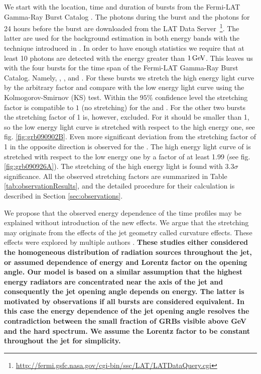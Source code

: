 \documentclass[manuscript]{aastex}
\begin{document}
We start with the location, time and duration of bursts from the
Fermi-LAT Gamma-Ray Burst Catalog \citep{Ackermann:2013zfa}. The
photons during the burst and the photons for 24 hours before the burst
are downloaded from the LAT Data
Server~\footnote{\url{http://fermi.gsfc.nasa.gov/cgi-bin/ssc/LAT/LATDataQuery.cgi}}.
The latter are used for the background estimation in both energy bands
with the technique introduced in \citet{Rubtsov:2011qq}. In order to
have enough statistics we require that at least 10 photons are
detected with the energy greater than $\unit[1]{GeV}$. This leaves us
with the four bursts for the time span of the Fermi-LAT Gamma-Ray
Burst Catalog. Namely,  \citep{Tajima:2009az}, 
\citep{Ackermann:2010us},  \citep{Abdo:2009pg} and
 \citep{Bregeon:2011bu}. For these bursts we stretch the
high energy light curve by the arbitrary factor and compare with the
low energy light curve using the Kolmogorov-Smirnov (KS) test. Within
the $95\%$ confidence level the stretching factor is compatible to $1$
(no stretching) for the  and . For the other two
bursts the stretching factor of 1 is, however, excluded.  For 
it should be smaller than 1, so the low energy light curve is
stretched with respect to the high energy one, see
fig. \ref{fig:grb090902B}.  Even more significant deviation from the
stretching factor of 1 in the opposite direction is observed for the
. The high energy light curve of  is stretched
with respect to the low energy one by a factor of at least 1.99 (see
fig. \ref{fig:grb090926A}).  The stretching of the  high
energy light is found with $3.3\sigma$ significance.  All the observed
stretching factors are summarized in Table
\ref{tab:observationResults}, and the detailed procedure for their
calculation is described in Section \ref{sec:observations}.

We propose that the observed energy dependence of the time profiles
may be explained without introduction of the new effects. We argue
that the stretching may originate from the effects of the jet geometry
called curvature effects. These effects were explored by multiple
authors {\bf \citep{Meszaros:1997je,Soderberg:2001mk,Nakamura:2001kd,Shen:2005ea,Shenoy:2013cba,granot2002off}}. {\bf These
studies either considered the homogeneous
distribution of radiation sources throughout the jet, or assumed dependence of energy and Lorentz factor on the opening angle. Our model is
based on a similar assumption that the highest energy radiators are
concentrated near the axis of the jet and consequently the jet opening
angle depends on energy. The latter is motivated by observations if
all bursts are considered equivalent. In this case the energy
dependence of the jet opening angle resolves the contradiction between
the small fraction of GRBs visible above GeV and the hard
spectrum. We assume the Lorentz factor to be constant throughout the jet for simplicity.}
\end{document}
